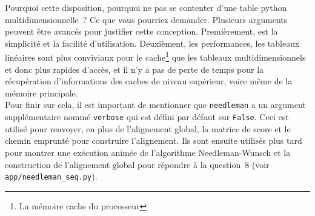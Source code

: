 \documentclass[12pt]{article}
\begin{document}
Pourquoi cette disposition, pourquoi ne pas se contenter d'une table python multidimensionnelle~? Ce que vous pourriez demander. Plusieurs arguments peuvent être avancés pour justifier cette conception. Premièrement, est la simplicité et la facilité d'utilisation. Deuxièment, les performances, les tableaux linéaires sont plus conviviaux pour le cache\footnote{La mémoire cache du processeur} que les tableaux multidimensionnels et donc plus rapides d'accès, et il n'y a pas de perte de temps pour la récupération d'informations des caches de niveau supérieur, voire même de la mémoire principale.\\
Pour finir sur cela, il est important de mentionner que \texttt{needleman} a un argument supplémentaire nommé \texttt{verbose} qui est défini par défaut sur \texttt{False}. Ceci est utilisé pour renvoyer, en plus de l'alignement global, la matrice de score et le chemin emprunté pour construire l'alignement. Ils sont ensuite utilisés plus tard pour montrer une exécution animée de l'algorithme Needleman-Wunsch et la construction de l'alignement global pour répondre à la question~8 (voir \texttt{app/needleman\_seq.py}).

\end{document}
